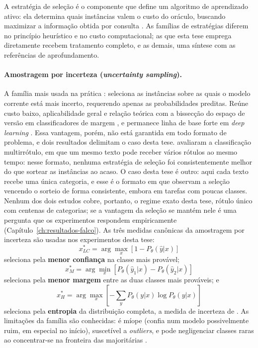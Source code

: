 A estratégia de seleção é o componente que define um algoritmo de aprendizado
ativo: ela determina quais instâncias valem o custo do oráculo, buscando
maximizar a informação obtida por consulta \citep{Settles2012}. As famílias de estratégias diferem no princípio heurístico e no
custo computacional; as que esta tese emprega diretamente recebem tratamento
completo, e as demais, uma síntese com as referências de aprofundamento.

\paragraph{Amostragem por incerteza (\textit{uncertainty sampling}).}
A família mais usada na prática \citep{Lewis1994heterogeneous, Settles2012}:
seleciona as instâncias sobre as quais o modelo corrente está mais incerto,
requerendo apenas as probabilidades preditas. Reúne custo baixo, aplicabilidade
geral e relação teórica com a bissecção do espaço de versão em
classificadores de margem \citep{Tong2000}, e permanece linha de base forte em
\textit{deep learning} \citep{Gal2017}. Essa vantagem, porém, não está
garantida em todo formato de problema, e dois resultados delimitam o caso
desta tese. \citet{Wertz2022} avaliaram a classificação multirrótulo, em que
um mesmo texto pode receber vários rótulos ao mesmo tempo: nesse formato,
nenhuma estratégia de seleção foi consistentemente melhor do que sortear as
instâncias ao acaso. O caso desta tese é outro: aqui cada texto recebe uma
única categoria, e esse é o formato em que \citet{Rouzegar2024} observam a
seleção vencendo o sorteio de forma consistente, embora em tarefas com poucas
classes. Nenhum dos dois estudos cobre, portanto, o regime exato desta tese,
rótulo único com centenas de categorias; se a vantagem da seleção se mantém
nele é uma pergunta que os experimentos respondem empiricamente
(Capítulo~\ref{ch:resultados-falco}). As três medidas canônicas da
amostragem por incerteza são usadas nos experimentos desta tese:
\begin{equation}
x^*_{LC} = \arg\max_x \left[ 1 - P_\theta(\hat{y}|x) \right]
\label{eq:lc}
\end{equation}
seleciona pela \textbf{menor confiança} na classe mais provável;
\begin{equation}
x^*_{M} = \arg\min_x \left[ P_\theta(\hat{y}_1|x) - P_\theta(\hat{y}_2|x) \right]
\label{eq:margin}
\end{equation}
seleciona pela \textbf{menor margem} entre as duas classes mais prováveis; e
\begin{equation}
x^*_{H} = \arg\max_x \left[ -\sum_y P_\theta(y|x) \log P_\theta(y|x) \right]
\label{eq:entropy}
\end{equation}
seleciona pela \textbf{entropia} da distribuição completa, a medida de
incerteza de \citet{Shannon1948}. As limitações da
família são conhecidas: é míope (confia num modelo possivelmente ruim, em
especial no início), suscetível a \textit{outliers}, e pode negligenciar
classes raras ao concentrar-se na fronteira das majoritárias
\citep{Settles2012, Attenberg2010}.

